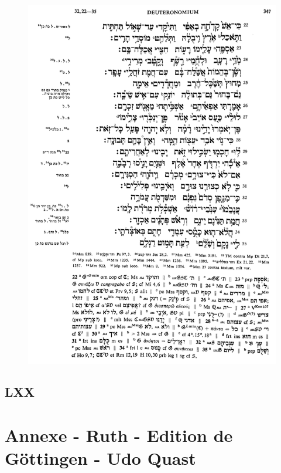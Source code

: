 \documentclass[11pt,a4paper]{article}
\begin{document}
\begin{figure}[!h]
\begin{minipage}[c]{.46\linewidth}
        \includegraphics[width=1\linewidth]{img/4Q44/BHS_Dt_32_1.png}
    \end{minipage}
\end{figure}
\subsection{LXX}
\newpage

\newpage


\section*{Annexe - Ruth - Edition de Göttingen - Udo Quast}
\end{document}
